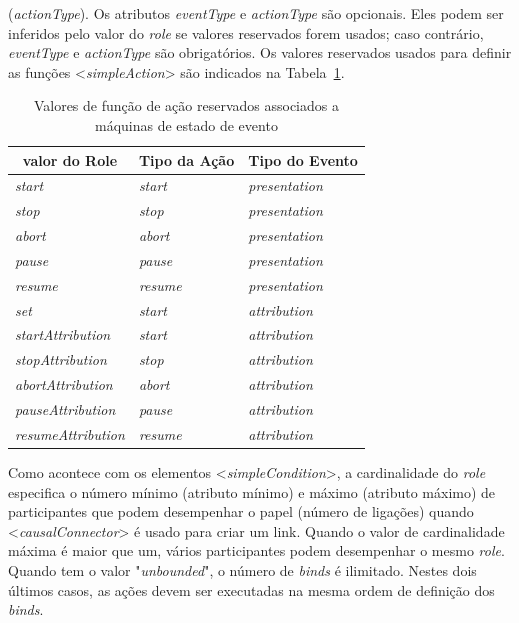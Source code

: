(\textit{actionType}). Os atributos \textit{eventType} e \textit{actionType} são opcionais. Eles podem ser inferidos pelo valor do \textit{role} se valores reservados forem usados; caso contrário, \textit{eventType} e \textit{actionType} são obrigatórios. Os valores reservados usados para definir as funções <\textit{simpleAction}> são indicados na Tabela~\ref{tab:acoes}.

\begin{table}[!ht] \footnotesize
\caption{Valores de função de ação reservados associados a máquinas de estado de evento\cite{ITU:2009ma}}
\label{tab:acoes}
\centering
{
 \renewcommand\arraystretch{1.0}
 \begin{tabular}{|p{3.0cm}|p{0.8cm}|p{3cm}|} \hline
  \multicolumn{1}{|c|}{valor do Role} & \multicolumn{1}{c|}{Tipo da Ação} & \multicolumn{1}{c|}{Tipo do Evento} \\\hline 
    \textit{start} & \textit{start} & \textit{presentation}\\\hline
    \textit{stop} & \textit{stop} & \textit{presentation}\\\hline
    \textit{abort} & \textit{abort} & \textit{presentation}\\\hline
    \textit{pause} & \textit{pause} & \textit{presentation}\\\hline
    \textit{resume} & \textit{resume} & \textit{presentation}\\\hline
    \textit{set} & \textit{start} & \textit{attribution}\\\hline
    \textit{startAttribution} & \textit{start} & \textit{attribution}\\\hline
    \textit{stopAttribution} & \textit{stop} & \textit{attribution}\\\hline
    \textit{abortAttribution} & \textit{abort} & \textit{attribution}\\\hline
    \textit{pauseAttribution} & \textit{pause} & \textit{attribution}\\\hline
    \textit{resumeAttribution} & \textit{resume} & \textit{attribution}\\\hline
  \end{tabular}
}
\end{table}

Como acontece com os elementos <\textit{simpleCondition}>, a cardinalidade do \textit{role} especifica o número mínimo (atributo mínimo) e máximo (atributo máximo) de participantes que podem desempenhar o papel (número de ligações) quando <\textit{causalConnector}> é usado para criar um link. Quando o valor de cardinalidade máxima é maior que um, vários participantes podem desempenhar o mesmo \textit{role}. Quando tem o valor "\textit{unbounded}", o número de \textit{binds} é ilimitado. Nestes dois últimos casos, as ações devem ser executadas na mesma ordem de definição dos \textit{binds}.

